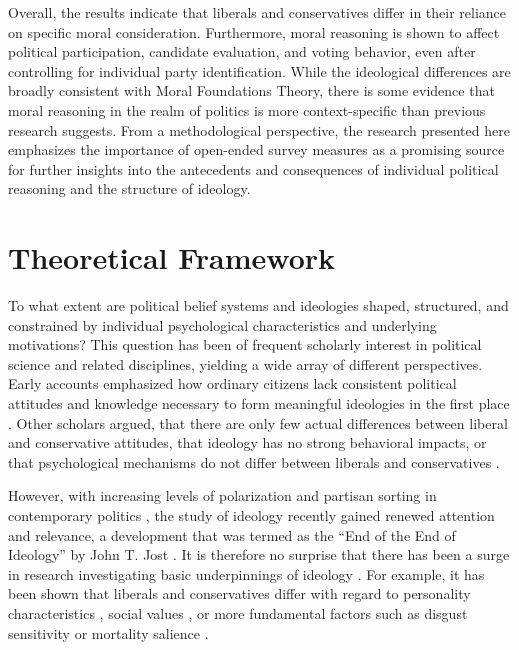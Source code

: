 \documentclass[12pt]{article}
\begin{document}
Overall, the results indicate that liberals and conservatives differ in their reliance on specific moral consideration. Furthermore, moral reasoning is shown to affect political participation, candidate evaluation, and voting behavior, even after controlling for individual party identification. While the ideological differences are broadly consistent with Moral Foundations Theory, there is some evidence that moral reasoning in the realm of politics is more context-specific than previous research suggests. From a methodological perspective, the research presented here emphasizes the importance of open-ended survey measures as a promising source for further insights into the antecedents and consequences of individual political reasoning and the structure of ideology.


\section{Theoretical Framework}

To what extent are political belief systems and ideologies shaped, structured, and constrained by individual psychological characteristics and underlying motivations? This question has been of frequent scholarly interest in political science and related disciplines, yielding a wide array of different perspectives. Early accounts emphasized how ordinary citizens lack consistent political attitudes and knowledge necessary to form meaningful ideologies in the first place \citep[e.g.][]{converse1964nature}. Other scholars argued, that there are only few actual differences between liberal and conservative attitudes, that ideology has no strong behavioral impacts, or that psychological mechanisms do not differ between liberals and conservatives \citep[see][for an overview regarding each of these points]{jost2006end}.

However, with increasing levels of polarization and partisan sorting in contemporary politics \citep[e.g.][]{iyengar2014fear}, the study of ideology recently gained renewed attention and relevance, a development that was termed as the ``End of the End of Ideology'' by John T. Jost \citeyearpar{jost2006end}. It is therefore no surprise that there has been a surge in research investigating basic underpinnings of ideology \citep[see also][]{jost2003political,jost2009political}. For example, it has been shown that liberals and conservatives differ with regard to personality characteristics \citep{gerber2010personality,hirsh2010compassionate,de2013personality,feldman2013understanding}, social values \citep{schwartz2010basic,schwartz2011basic,piurko2011basic}, or more fundamental factors such as disgust sensitivity \citep{inbar2009conservatives} or mortality salience \citep{burke2013death}.
\end{document}
